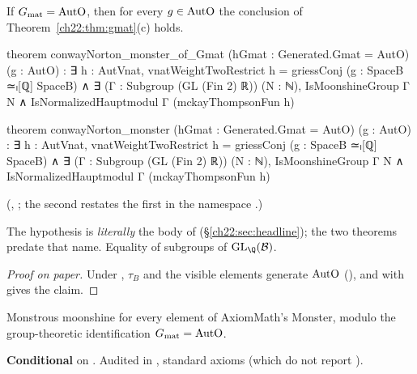 \begin{theorem}[Conway--Norton for all of $\chtwentytwoAutO$, given $\chtwentytwoGmat=\chtwentytwoAutO$]\label{ch22:thm:cnmonster}
If $\chtwentytwoGmat=\chtwentytwoAutO$, then for every $g\in\mathrm{AutO}$ the conclusion of
Theorem~\ref{ch22:thm:gmat}(c) holds.
\end{theorem}
\begin{leancode}
theorem conwayNorton_monster_of_Gmat (hGmat : Generated.Gmat = AutO) (g : AutO) :
    ∃ h : AutVnat, vnatWeightTwoRestrict h = griessConj (g : SpaceB ≃ₗ[ℚ] SpaceB) ∧
      ∃ (Γ : Subgroup (GL (Fin 2) ℝ)) (N : ℕ), IsMoonshineGroup Γ N ∧
        IsNormalizedHauptmodul Γ (mckayThompsonFun h)
\end{leancode}
\begin{leancode}
theorem conwayNorton_monster (hGmat : Generated.Gmat = AutO) (g : AutO) :
    ∃ h : AutVnat, vnatWeightTwoRestrict h = griessConj (g : SpaceB ≃ₗ[ℚ] SpaceB) ∧
      ∃ (Γ : Subgroup (GL (Fin 2) ℝ)) (N : ℕ), IsMoonshineGroup Γ N ∧
        IsNormalizedHauptmodul Γ (mckayThompsonFun h)
\end{leancode}
(, ; the
second restates the first in the namespace .)
\begin{dictionary}
The hypothesis  is \emph{literally} the body of 
(\S\ref{ch22:sec:headline}); the two theorems predate that name.  Equality of subgroups of $\mathrm{GL}_\Q(\chtwentytwoB)$.
\end{dictionary}
\begin{proof}[Proof on paper]
Under , $\tau_B$ and the visible elements generate $\chtwentytwoAutO$ (), and
 with  gives the claim.
\end{proof}
\begin{physics}Monstrous moonshine for every element of AxiomMath's Monster, modulo the group-theoretic identification
$\chtwentytwoGmat=\chtwentytwoAutO$.\end{physics}
\begin{status}\textbf{Conditional} on .  Audited in ,
standard axioms (which do not report ).\end{status}

